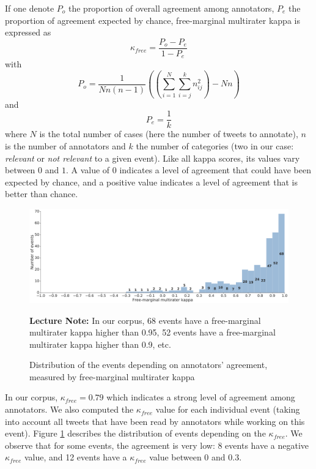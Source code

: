 If one denote $P_o$ the proportion of overall agreement among annotators, $P_e$ the proportion of agreement expected by chance, free-marginal multirater kappa is expressed as 
$$
\kappa_{free} = \frac{P_o - P_e}{1 - P_e}
$$
with 
$$
P_o = \frac{1}{Nn(n-1)}((\sum_{i=1}^N\sum_{i=j}^kn_{ij}^2)-Nn)
$$
and
$$
P_e = \frac{1}{k}
$$
where $N$ is the total number of cases (here the number of tweets to annotate), $n$ is the number of annotators and $k$ the number of categories (two in our case: \textit{relevant} or \textit{not relevant} to a given event). Like all kappa scores, its values vary between $0$ and $1$. A value of $0$ indicates a level of agreement that could have been expected by chance, and a positive value indicates a level of agreement that is better than chance.


\begin{figure}
\begin{center}
\includegraphics[width=1\textwidth]{figures/HistogramEventsDistributionByKappa.pdf}
\end{center}
{\scriptsize \textbf{Lecture Note:} In our corpus, 68 events have a free-marginal multirater kappa higher than 0.95, 52 events have a free-marginal multirater kappa higher than 0.9, etc.
}
\caption{Distribution of the events depending on annotators' agreement, measured by free-marginal multirater kappa}
\label{Figure:HistogramEventsByKappa}
\end{figure}

In our corpus, $\kappa_{free} = 0.79$ which indicates a strong level of agreement among annotators. We also computed the $\kappa_{free}$ value for  each individual event (taking into account all tweets that have been read by annotators while working on this event). Figure \ref{Figure:HistogramEventsByKappa} describes the distribution of events depending on the $\kappa_{free}$. We observe that for some events, the agreement is very low: 8 events have a negative $\kappa_{free}$ value, and 12 events have a $\kappa_{free}$ value between 0 and 0.3.


